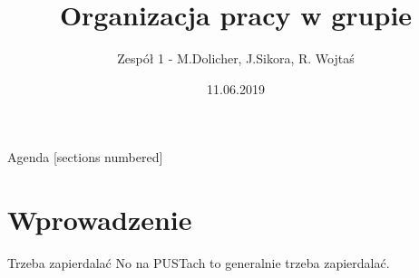 \documentclass[12pt]{beamer}
\title{Organizacja pracy w grupie}
\date{11.06.2019}
\author{Zespół 1 - M.Dolicher, J.Sikora, R. Wojtaś}
\institute{Projektowanie układów sterowania (projekt grupowy) - edycja 19L}
\begin{document}
\maketitle

\begin{frame}{Agenda}
  [sections numbered]
  \tableofcontents[hideallsubsections]
\end{frame}

\section{Wprowadzenie}

\begin{frame}[fragile]{Trzeba zapierdalać}
    No na PUSTach to generalnie trzeba zapierdalać.
\end{frame}
\end{document}
